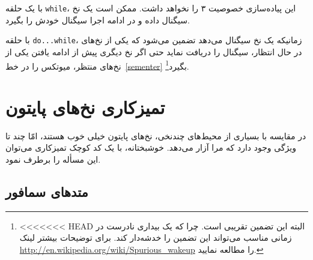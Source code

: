 \documentclass{book}
\begin{document}
    با یک حلقه {\tt while}، این پیاده‌سازی خصوصیت ۳ را نخواهد داشت. ممکن است یک نخ سیگنال داده و در ادامه اجرا سیگنال خودش 
    را بگیرد. 

    با حلقه {\tt do...while}، زمانیکه یک نخ سیگنال می‌دهد تضمین می‌شود که یکی از نخ‌های در حال انتظار، سیگنال را دریافت نماید 
    حتی اگر نخ دیگری  پیش از ادامه یافتن یکی از نخ‌های منتظر، میوتکس را در خط~\ref{sementer} بگیرد\footnote{
<<<<<<< HEAD
    البته این تضمین تقریبی است. چرا که یک بیداری نادرست در زمانی مناسب می‌تواند این تضمین را خدشه‌دار کند. برای توضیحات بیشتر لینک 
    \url{http://en.wikipedia.org/wiki/Spurious_wakeup} را مطالعه نمایید. 
    }.



\setLTRbibitems



\appendix

\chapter{تمیزکاری نخ‌های پایتون}
\label{cleanup}

    در مقایسه با  بسیاری از محیط‌های چندنخی، نخ‌های پایتون خیلی خوب هستند، امّا چند تا ویژگی وجود دارد که مرا آزار می‌دهد. 
    خوشبختانه،‌ با یک کد کوچک تمیزکاری می‌توان این مسأله را برطرف نمود. 

\section{متدهای سمافور}
\end{document}
